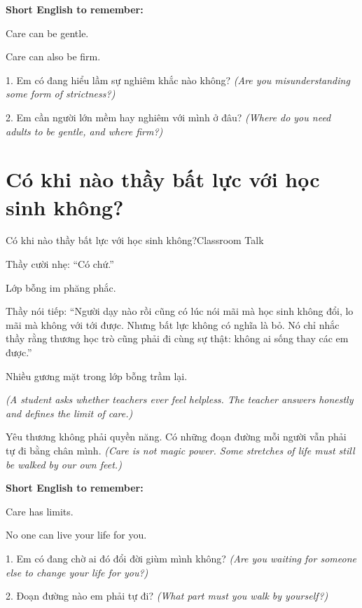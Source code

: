 \begin{ghinhoanh}
\textbf{Short English to remember:}

Care can be gentle.

Care can also be firm.
\end{ghinhoanh}

\begin{tuhocnhanh}
1. Em có đang hiểu lầm sự nghiêm khắc nào không? \textit{(Are you misunderstanding some form of strictness?)}

2. Em cần người lớn mềm hay nghiêm với mình ở đâu? \textit{(Where do you need adults to be gentle, and where firm?)}
\end{tuhocnhanh}
\ngancach

\section{Có khi nào thầy bất lực với học sinh không?}
\begin{truyen}{Có khi nào thầy bất lực với học sinh không?}{Classroom Talk}

Thầy cười nhẹ: ``Có chứ.''

Lớp bỗng im phăng phắc.

Thầy nói tiếp: ``Người dạy nào rồi cũng có lúc nói mãi mà học sinh không đổi, lo mãi mà không với tới được. Nhưng bất lực không có nghĩa là bỏ. Nó chỉ nhắc thầy rằng thương học trò cũng phải đi cùng sự thật: không ai sống thay các em được.''

Nhiều gương mặt trong lớp bỗng trầm lại.

\textit{(A student asks whether teachers ever feel helpless. The teacher answers honestly and defines the limit of care.)}
\end{truyen}

\begin{baihoc}
Yêu thương không phải quyền năng. Có những đoạn đường mỗi người vẫn phải tự đi bằng chân mình.
\textit{(Care is not magic power. Some stretches of life must still be walked by our own feet.)}
\end{baihoc}

\begin{ghinhoanh}
\textbf{Short English to remember:}

Care has limits.

No one can live your life for you.
\end{ghinhoanh}

\begin{tuhocnhanh}
1. Em có đang chờ ai đó đổi đời giùm mình không? \textit{(Are you waiting for someone else to change your life for you?)}

2. Đoạn đường nào em phải tự đi? \textit{(What part must you walk by yourself?)}
\end{tuhocnhanh}
\ngancach

